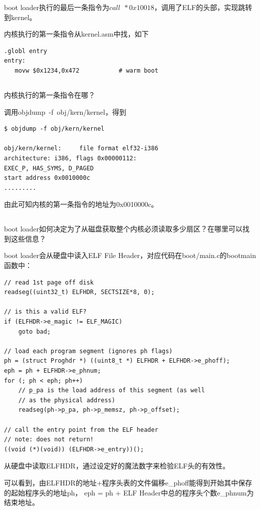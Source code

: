 \documentclass[12pt,a4paper,UTF8]{article}
\begin{document}
	boot loader执行的最后一条指令为$call\ \ *0x10018$，调用了ELF的头部，实现跳转到kernel。

	内核执行的第一条指令从kernel.asm中找，如下
	\begin{lstlisting}[style=MASM]
.globl entry
entry:
   movw	$0x1234,0x472			# warm boot
	\end{lstlisting}
    \subsection{}
	内核执行的第一条指令在哪？

	调用objdump\ -f\ obj/kern/kernel，得到
	\begin{lstlisting}[style=BASH]
$ objdump -f obj/kern/kernel

obj/kern/kernel:     file format elf32-i386
architecture: i386, flags 0x00000112:
EXEC_P, HAS_SYMS, D_PAGED
start address 0x0010000c
.........
	\end{lstlisting}

	由此可知内核的第一条指令的地址为0x0010000c。

	\subsection{}
	boot loader如何决定为了从磁盘获取整个内核必须读取多少扇区？在哪里可以找到这些信息？

	boot loader会从硬盘中读入ELF File Header，对应代码在boot/main.c的bootmain函数中：
	\begin{lstlisting}[style=CPP]
// read 1st page off disk
readseg((uint32_t) ELFHDR, SECTSIZE*8, 0);

// is this a valid ELF?
if (ELFHDR->e_magic != ELF_MAGIC)
	goto bad;

// load each program segment (ignores ph flags)
ph = (struct Proghdr *) ((uint8_t *) ELFHDR + ELFHDR->e_phoff);
eph = ph + ELFHDR->e_phnum;
for (; ph < eph; ph++)
	// p_pa is the load address of this segment (as well
	// as the physical address)
	readseg(ph->p_pa, ph->p_memsz, ph->p_offset);

// call the entry point from the ELF header
// note: does not return!
((void (*)(void)) (ELFHDR->e_entry))();
	\end{lstlisting}

	从硬盘中读取ELFHDR，通过设定好的魔法数字来检验ELF头的有效性。

	可以看到，由ELFHDR的地址+程序头表的文件偏移e\_phoff能得到开始其中保存的起始程序头的地址ph，
	eph = ph + ELF Header中总的程序头个数e\_phnum为结束地址。
\end{document}
